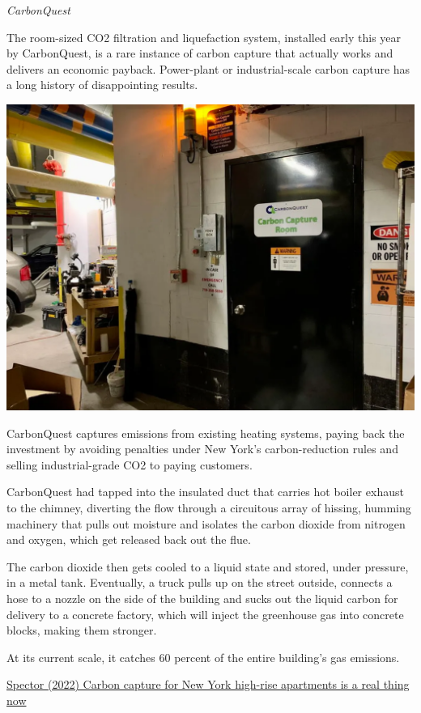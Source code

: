 \documentclass[
]{book}
\begin{document}
\emph{CarbonQuest}

The room-sized CO2 filtration and liquefaction system, installed early this year by CarbonQuest, is a rare instance of carbon capture that actually works and delivers an economic payback. Power-plant or industrial-scale carbon capture has a long history of disappointing results.

\includegraphics{fig/carbon_capture_room.png}

CarbonQuest captures emissions from existing heating systems, paying back the investment by avoiding penalties under New York's carbon-reduction rules and selling industrial-grade CO2 to paying customers.

CarbonQuest had tapped into the insulated duct that carries hot boiler exhaust to the chimney, diverting the flow through a circuitous array of hissing, humming machinery that pulls out moisture and isolates the carbon dioxide from nitrogen and oxygen, which get released back out the flue.

The carbon dioxide then gets cooled to a liquid state and stored, under pressure, in a metal tank. Eventually, a truck pulls up on the street outside, connects a hose to a nozzle on the side of the building and sucks out the liquid carbon for delivery to a concrete factory, which will inject the greenhouse gas into concrete blocks, making them stronger.

At its current scale, it catches 60 percent of the entire building's gas emissions.

\href{https://www.canarymedia.com/articles/carbon-capture/carbon-capture-for-new-york-high-rise-apartments-is-a-real-thing-now}{Spector (2022) Carbon capture for New York high-rise apartments is a real thing now}
\end{document}
